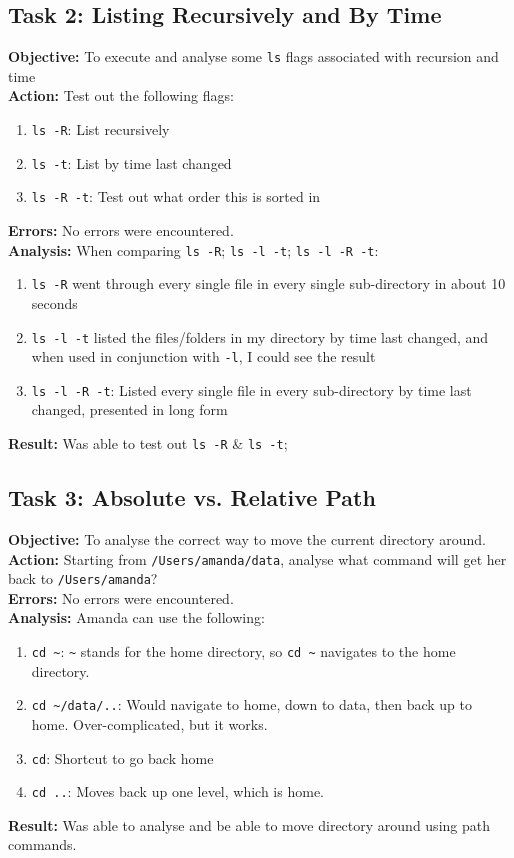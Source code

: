 \documentclass{article}
\begin{document}
\subsection{Task 2: Listing Recursively and By Time}
%
\textbf{Objective:} To execute and analyse some \texttt{ls} flags associated with recursion and time\\
\textbf{Action:} Test out the following flags:
\begin{enumerate}
    \item \verb|ls -R|: List recursively
    \item \verb|ls -t|: List by time last changed
    \item \verb|ls -R -t|: Test out what order this is sorted in
\end{enumerate}
\textbf{Errors:} No errors were encountered.\\
\textbf{Analysis:} When comparing \verb|ls -R|; \verb|ls -l -t|; \verb|ls -l -R -t|:
\begin{enumerate}
    \item \verb|ls -R| went through every single file in every single sub-directory in about 10 seconds
    \item \verb|ls -l -t| listed the files/folders in my directory by time last changed, and when used in conjunction with \verb|-l|, I could see the result
    \item \verb|ls -l -R -t|: Listed every single file in every sub-directory by time last changed, presented in long form
\end{enumerate}
\textbf{Result:} Was able to test out \verb|ls -R| \& \verb|ls -t|;
%
\subsection{Task 3: Absolute vs. Relative Path }
%
\textbf{Objective:} To analyse the correct way to move the current directory around.\\
\textbf{Action:} Starting from \texttt{/Users/amanda/data}, analyse what command will get her back to \texttt{/Users/amanda}?\\
\textbf{Errors:} No errors were encountered.\\
\textbf{Analysis:} Amanda can use the following:
\begin{enumerate}
    \item \verb|cd ~|: \verb|~| stands for the home directory, so \verb|cd ~| navigates to the home directory.
    \item \verb|cd ~/data/..|: Would navigate to home, down to data, then back up to home. Over-complicated, but it works.
    \item \verb|cd|: Shortcut to go back home
    \item \verb|cd ..|: Moves back up one level, which is home.
\end{enumerate}
\textbf{Result:} Was able to analyse and be able to move directory around using path commands.
%
\end{document}
